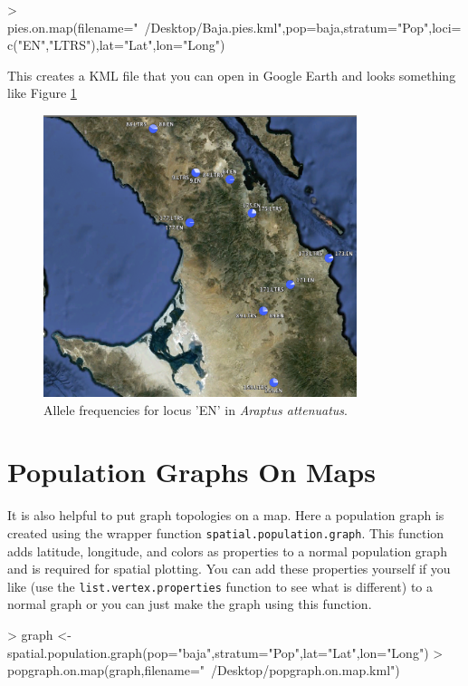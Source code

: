 \documentclass[letterpaper,twoside,openany]{book}
\begin{document}
\begin{Schunk}
\begin{Sinput}
> pies.on.map(filename="~/Desktop/Baja.pies.kml",pop=baja,stratum="Pop",loci=c("EN","LTRS"),lat="Lat",lon="Long")
\end{Sinput}
\end{Schunk}

This creates a KML file that you can open in Google Earth and looks something like Figure \ref{fig:baja.pies}

\begin{figure}[p]
	\centering
	\includegraphics{baja_pies}
	\caption{Allele frequencies for locus 'EN' in \emph{Araptus attenuatus}.}
	\label{fig:baja.pies}
\end{figure}

\clearpage
\section{Population Graphs On Maps}

It is also helpful to put graph topologies on a map.  Here a population graph is created using the wrapper function \texttt{spatial.population.graph}.  This function adds latitude, longitude, and colors as properties to a normal population graph and is required for spatial plotting.  You can add these properties yourself if you like (use the \texttt{list.vertex.properties} function to see what is different) to a normal graph or you can just make the graph using this function.

\begin{Schunk}
\begin{Sinput}
> graph <- spatial.population.graph(pop="baja",stratum="Pop",lat="Lat",lon="Long")
> popgraph.on.map(graph,filename="~/Desktop/popgraph.on.map.kml")
\end{Sinput}
\end{Schunk}
\end{document}
